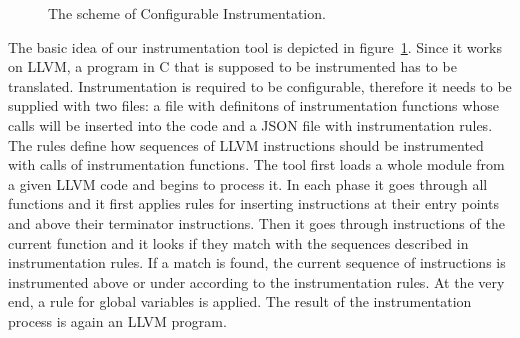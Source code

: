 
\begin{figure}[h]
  \centering
  \caption{The scheme of Configurable Instrumentation.}
  \label{fig:scheme}
\end{figure}

The basic idea of our instrumentation tool is depicted in
figure~\ref{fig:scheme}. Since it works on LLVM, a program in C that is
supposed to be instrumented has to be translated. Instrumentation is required
to be configurable, therefore it needs to be supplied with two files: a file
with definitons of instrumentation functions whose calls will be inserted into
the code and a JSON file with instrumentation rules. The rules define how
sequences of LLVM instructions should be instrumented with calls of
instrumentation functions. The tool first loads a whole module from a given
LLVM code and begins to process it. In each phase it goes through all functions
and it first applies rules for inserting instructions at their entry points and
above their terminator instructions. Then it goes through instructions of the
current function and it looks if they match with the sequences described in
instrumentation rules. If a match is found, the current sequence of
instructions is instrumented above or under according to the instrumentation
rules. At the very end, a rule for global variables is applied. The result of
the instrumentation process is again an LLVM program.

